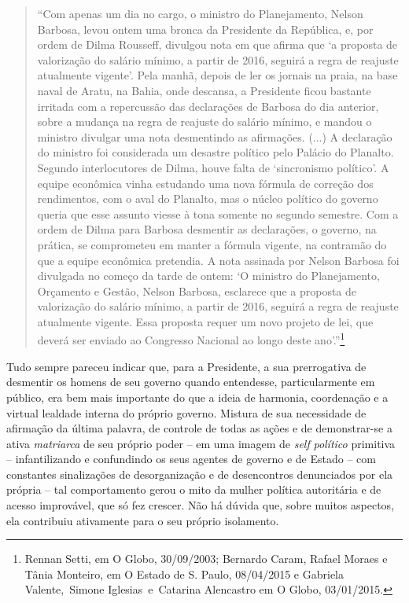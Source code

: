 \asterisc

\begin{quote}
``Com apenas um dia no cargo, o ministro do Planejamento, Nelson
Barbosa, levou ontem uma bronca da Presidente da República, e, por ordem
de Dilma Rousseff, divulgou nota em que afirma que `a proposta de
valorização do salário mínimo, a partir de 2016, seguirá a regra de
reajuste atualmente vigente'. Pela manhã, depois de ler os jornais na
praia, na base naval de Aratu, na Bahia, onde descansa, a Presidente
ficou bastante irritada com a repercussão das declarações de Barbosa do
dia anterior, sobre a mudança na regra de reajuste do salário mínimo, e
mandou o ministro divulgar uma nota desmentindo as afirmações. (...) A
declaração do ministro foi considerada um desastre político pelo Palácio
do Planalto. Segundo interlocutores de Dilma, houve falta de
`sincronismo político'. A equipe econômica vinha estudando uma nova
fórmula de correção dos rendimentos, com o aval do Planalto, mas o
núcleo político do governo queria que esse assunto viesse à tona somente
no segundo semestre. Com a ordem de Dilma para Barbosa desmentir as
declarações, o governo, na prática, se comprometeu em manter a fórmula
vigente, na contramão do que a equipe econômica pretendia. A nota
assinada por Nelson Barbosa foi divulgada no começo da tarde de ontem:
`O ministro do Planejamento, Orçamento e Gestão, Nelson Barbosa,
esclarece que a proposta de valorização do salário mínimo, a partir de
2016, seguirá a regra de reajuste atualmente vigente. Essa proposta
requer um novo projeto de lei, que deverá ser enviado ao Congresso
Nacional ao longo deste ano'.''\footnote{Rennan Setti, em O Globo,
  30/09/2003; Bernardo Caram, Rafael Moraes e Tânia Monteiro, em O
  Estado de S. Paulo, 08/04/2015 e Gabriela Valente,~Simone
  Iglesias~e~Catarina Alencastro em O Globo, 03/01/2015.}
\end{quote}

Tudo sempre pareceu indicar que, para a Presidente, a sua prerrogativa
de desmentir os homens de seu governo quando entendesse, particularmente
em público, era bem mais importante do que a ideia de harmonia,
coordenação e a virtual lealdade interna do próprio governo. Mistura de
sua necessidade de afirmação da última palavra, de controle de todas as
ações e de demonstrar-se a ativa \emph{matriarca} de seu próprio poder
-- em uma imagem de \emph{self} \emph{político} primitiva --
infantilizando e confundindo os seus agentes de governo e de Estado --
com constantes sinalizações de desorganização e de desencontros
denunciados por ela própria -- tal comportamento gerou o mito da mulher
política autoritária e de acesso improvável, que só fez crescer. Não há
dúvida que, sobre muitos aspectos, ela contribuiu ativamente para o seu
próprio isolamento.

